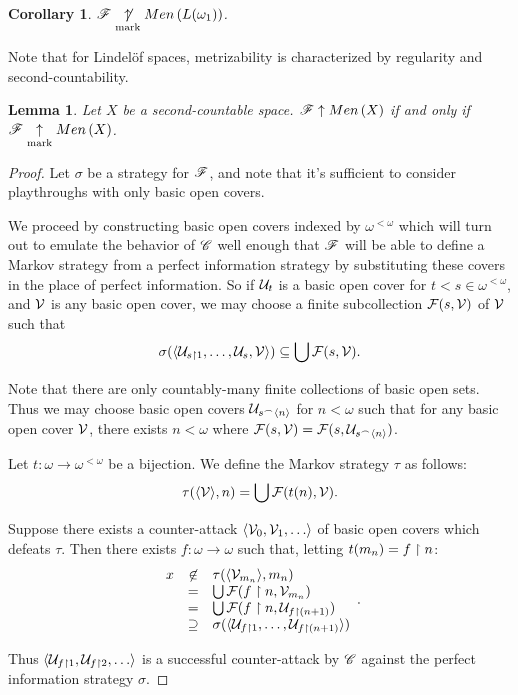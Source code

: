 \documentclass{amsart}
\newtheorem{lemma}[theorem]{Lemma}
\newtheorem{corollary}[theorem]{Corollary}
\theoremstyle{definition}
\begin{document}
\begin{corollary}
  \(\mathscr{F}\underset{\text{mark}}{\not\uparrow}Men\left({L(\omega_1)}\right)\).
\end{corollary}

Note that for Lindel\"of spaces, metrizability is characterized by regularity
and second-countability.

\begin{lemma}
  Let \(X\) be a second-countable space. \(\mathscr{F}\uparrow Men\left({X}\right)\) if and only if
  \(\mathscr{F}\underset{\text{mark}}{\uparrow}Men\left({X}\right)\).
\end{lemma}

\begin{proof}
  Let \(\sigma\) be a strategy for \(\mathscr{F}\), and note that
  it's sufficient to consider playthroughs with only basic open covers.

  We proceed by constructing basic open covers indexed by \(\omega^{<\omega}\)
  which will turn out to emulate the behavior of \(\mathscr{C}\) well enough
  that \(\mathscr{F}\) will be able to define a Markov strategy from a perfect
  information strategy by substituting
  these covers in the place of perfect information.
  So if \(\mathcal{U}_t\) is a basic open cover for \(t<s\in\omega^{<\omega}\), and
  \(\mathcal{V}\) is any basic open cover, we may choose a finite subcollection
  \(\mathcal{F}(s,\mathcal{V})\) of \(\mathcal{V}\) such that
  \[
    \sigma(\langle\mathcal{U}_{s\restriction 1},\dots,\mathcal{U}_{s},\mathcal{V}\rangle)
      \subseteq
    \bigcup \mathcal{F}(s,\mathcal{V})
  .\]

  Note that there are only countably-many finite collections of basic open sets.
  Thus we may choose basic open covers \(\mathcal{U}_{s{^\frown}\langle n\rangle}\) for \(n<\omega\)
  such that for any basic open cover \(\mathcal{V}\), there exists \(n<\omega\) where
  \(\mathcal{F}(s,\mathcal{V})=\mathcal{F}(s,\mathcal{U}_{s{^\frown}\langle n\rangle})\).

  Let \(t:\omega\to\omega^{<\omega}\) be a bijection. We define the Markov
  strategy \(\tau\) as follows:
  \[
    \tau(\langle\mathcal{V}\rangle, n)
      =
    \bigcup \mathcal{F}(t(n),\mathcal{V})
  .\]

  Suppose there exists a counter-attack \(\<\mc V_0,\mc V_1,\dots\>\) of
  basic open covers which defeats \(\tau\). Then there exists
  \(f:\omega\to\omega\) such that, letting \(t(m_n)=f\restriction n\):
  \[
    \begin{array}{rcl}
    x & \not\in & \tau(\langle\mathcal{V}_{m_n}\rangle,m_n) \\
    & = & \bigcup\mathcal{F}(f\restriction n,\mathcal{V}_{m_n}) \\
    & = & \bigcup\mathcal{F}(f\restriction n,\mathcal{U}_{f\restriction (n+1)}) \\
    & \supseteq & \sigma(\langle\mathcal{U}_{f\restriction 1},\dots,\mathcal{U}_{f\restriction(n+1)}\rangle)
    \end{array}
  .\]

  Thus \(\<\mc U_{f\rest 1}, \mc U_{f\rest 2},\dots\>\) is a successful
  counter-attack by \(\mathscr{C}\) against the perfect information strategy \(\sigma\).
\end{proof}
\end{document}

